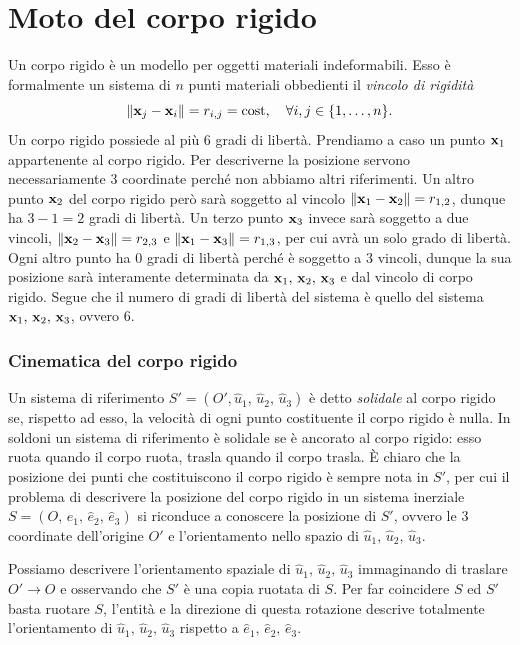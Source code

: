\chapter{Moto del corpo rigido}
    Un corpo rigido è un modello per oggetti materiali indeformabili. Esso è formalmente un sistema di $n$ punti materiali obbedienti il \emph{vincolo di rigidità}
    \begin{equation}
        \|\mathbf{x}_j-\mathbf{x}_i\|=r_{i,j}=\mathrm{cost},\quad\forall i,j \in \{1,\dots,n\}.
    \end{equation}
    Un corpo rigido possiede al più $6$ gradi di libertà. Prendiamo a caso un punto $\mathbf{x}_1$ appartenente al corpo rigido. Per descriverne la posizione servono necessariamente 3 coordinate perché non abbiamo altri riferimenti. Un altro punto $\mathbf{x}_2$ del corpo rigido però sarà soggetto al vincolo $ \|\mathbf{x}_1-\mathbf{x}_2\|=r_{1,2}$, dunque ha $3-1=2$ gradi di libertà. Un terzo punto $\mathbf{x}_3$ invece sarà soggetto a due vincoli,  $\|\mathbf{x}_2-\mathbf{x}_3\|=r_{2,3}$ e $ \|\mathbf{x}_1-\mathbf{x}_3\|=r_{1,3}$, per cui avrà un solo grado di libertà. Ogni altro punto ha 0 gradi di libertà perché è soggetto a 3 vincoli, dunque la sua posizione sarà interamente determinata da $\mathbf{x}_1,\,\mathbf{x}_2,\,\mathbf{x}_3$ e dal vincolo di corpo rigido. Segue che il numero di gradi di libertà del sistema è quello del sistema $\mathbf{x}_1,\,\mathbf{x}_2,\,\mathbf{x}_3$, ovvero 6.
    \subsection{Cinematica del corpo rigido}
    Un sistema di riferimento $S'=(O',\hat{u}_1,\,\hat{u}_2,\,\hat{u}_3)$ è detto \emph{solidale} al corpo rigido se, rispetto ad esso, la velocità di ogni punto costituente il corpo rigido è nulla. In soldoni un sistema di riferimento è solidale se è ancorato al corpo rigido: esso ruota quando il corpo ruota, trasla quando il corpo trasla. È chiaro che la posizione dei punti che costituiscono il corpo rigido è sempre nota in $S'$, per cui il problema di descrivere la posizione del corpo rigido in un sistema inerziale $S=(O,\,\hat{e}_1,\,\hat{e}_2,\,\hat{e}_3)$ si riconduce a conoscere la posizione di $S'$, ovvero le $3$ coordinate dell'origine $O'$ e l'orientamento nello spazio di $\hat{u}_1,\,\hat{u}_2,\,\hat{u}_3$.
    
    Possiamo descrivere l'orientamento spaziale di $\hat{u}_1,\,\hat{u}_2,\,\hat{u}_3$ immaginando di traslare $O'\to O$ e osservando che $S'$ è una copia ruotata di $S$. Per far coincidere $S$ ed $S'$ basta ruotare $S$, l'entità e la direzione di questa rotazione descrive totalmente l'orientamento di $\hat{u}_1,\,\hat{u}_2,\,\hat{u}_3$ rispetto a $\hat{e}_1,\,\hat{e}_2,\,\hat{e}_3$.

